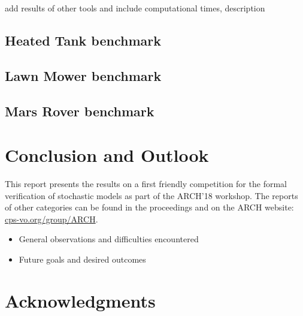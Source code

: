 \documentclass[EPiC]{easychair}
\newcommand{\todo}[1]{
  \begin{framed}
    \noindent{\bf TODO: }
    #1
  \end{framed}
}
\begin{document}
\todo{add results of other tools and include computational times, description}

\newpage


\subsection{Heated Tank benchmark}
\newpage

\subsection{Lawn Mower benchmark}
\newpage

\subsection{Mars Rover benchmark}
\section{Conclusion and Outlook}
\label{sect:conclusion}

This report presents the results on a first friendly competition for the formal verification of stochastic models as part of the ARCH'18 workshop. The reports of other categories can be found in the proceedings and on the ARCH website:  \href{http://cps-vo.org/group/ARCH}{cps-vo.org/group/ARCH}.  

\todo{
\begin{itemize}
\item General observations and difficulties encountered 
\item Future goals and desired outcomes
\end{itemize}
}

\section{Acknowledgments}
\label{sec:acks}



\end{document}
